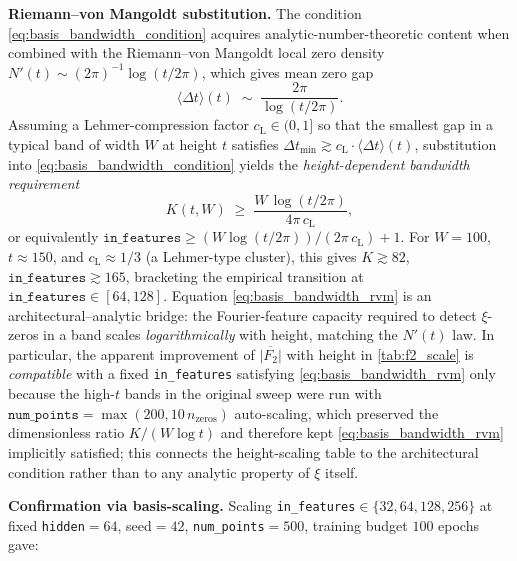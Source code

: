 \documentclass[11pt, a4paper]{article}
\theoremstyle{definition}
\theoremstyle{plain}
\begin{document}
\smallskip
\noindent\textbf{Riemann--von Mangoldt substitution.} The
condition \eqref{eq:basis_bandwidth_condition} acquires
analytic-number-theoretic content when combined with the
Riemann--von Mangoldt local zero density
$N'(t)\sim (2\pi)^{-1}\log(t/2\pi)$, which gives mean zero gap
\begin{equation}
  \langle\Delta t\rangle(t)\;\sim\;\frac{2\pi}{\log(t/2\pi)}.
\end{equation}
Assuming a Lehmer-compression factor $c_{\mathrm{L}}\in(0,1]$
so that the smallest gap in a typical band of width $W$ at
height $t$ satisfies
$\Delta t_{\min}\gtrsim c_{\mathrm{L}}\cdot\langle\Delta
  t\rangle(t)$,
substitution into \eqref{eq:basis_bandwidth_condition} yields
the \emph{height-dependent bandwidth requirement}
\begin{equation}
  K(t,W)\;\geq\;
  \frac{W\,\log(t/2\pi)}{4\pi\,c_{\mathrm{L}}},
  \label{eq:basis_bandwidth_rvm}
\end{equation}
or equivalently
$\texttt{in\_features}\geq (W\log(t/2\pi))/(2\pi\,c_{\mathrm{L}})+1$.
For $W=100$, $t\approx 150$, and $c_{\mathrm{L}}\approx 1/3$
(a Lehmer-type cluster), this gives $K\gtrsim 82$,
$\texttt{in\_features}\gtrsim 165$, bracketing the empirical
transition at $\texttt{in\_features}\in[64,128]$. Equation
\eqref{eq:basis_bandwidth_rvm} is an architectural--analytic
bridge: the Fourier-feature capacity required to detect
$\xi$-zeros in a band scales \emph{logarithmically} with
height, matching the $N'(t)$ law. In particular, the apparent
improvement of $\overline{|F_2|}$ with height in
\cref{tab:f2_scale} is \emph{compatible} with a fixed
\texttt{in\_features} satisfying
\eqref{eq:basis_bandwidth_rvm} only because the high-$t$ bands
in the original sweep were run with
$\texttt{num\_points}=\max(200,10\,n_{\mathrm{zeros}})$
auto-scaling, which preserved the dimensionless ratio
$K/(W\log t)$ and therefore kept
\eqref{eq:basis_bandwidth_rvm} implicitly satisfied; this
connects the height-scaling table to the architectural
condition rather than to any analytic property of $\xi$
itself.

\smallskip
\noindent\textbf{Confirmation via basis-scaling.} Scaling
\texttt{in\_features}$\in\{32,64,128,256\}$ at fixed
\texttt{hidden}$=64$, seed$=42$, \texttt{num\_points}$=500$,
training budget $100$ epochs gave:
\end{document}
